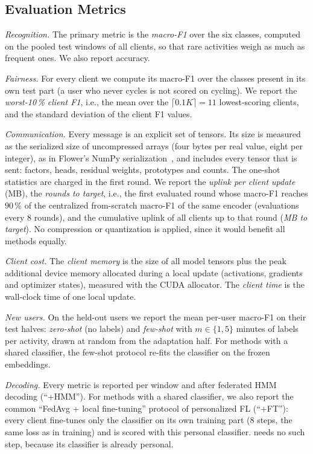 \subsection{Evaluation Metrics}\label{sec:data:metrics}

\emph{Recognition.} The primary metric is the \emph{macro-F1} over the six classes, computed on the
pooled test windows of all clients, so that rare activities weigh as much as frequent ones. We
also report accuracy.

\emph{Fairness.} For every client we compute its macro-F1 over the classes present in its own test
part (a user who never cycles is not scored on cycling). We report the \emph{worst-10\,\% client F1},
i.e., the mean over the $\lceil0.1K\rceil=11$ lowest-scoring clients, and the standard deviation of
the client F1 values.

\emph{Communication.} Every message is an explicit set of tensors. Its size is measured as the
serialized size of uncompressed arrays (four bytes per real value, eight per integer), as in
Flower's NumPy serialization~\cite{beutel2020flower}, and includes every tensor that is sent: factors,
heads, residual weights, prototypes and counts. The one-shot statistics are charged in the first
round. We report the \emph{uplink per client update} (MB), the \emph{rounds to target}, i.e., the first
evaluated round whose macro-F1 reaches $90\,\%$ of the centralized from-scratch macro-F1 of the same
encoder (evaluations every $8$ rounds), and the cumulative uplink of all clients up to that round
(\emph{MB to target}). No compression or quantization is applied, since it would benefit all methods
equally.

\emph{Client cost.} The \emph{client memory} is the size of all model tensors plus the peak additional
device memory allocated during a local update (activations, gradients and optimizer states), measured
with the CUDA allocator. The \emph{client time} is the wall-clock time of one local update.

\emph{New users.} On the \NumHeldout{} held-out users we report the mean per-user macro-F1 on their test
halves: \emph{zero-shot} (no labels) and \emph{few-shot} with $m\in\{1,5\}$ minutes of labels per
activity, drawn at random from the adaptation half. For methods with a shared classifier, the
few-shot protocol re-fits the classifier on the frozen embeddings.

\emph{Decoding.} Every metric is reported per window and after federated HMM decoding (``+HMM'').
For methods with a shared classifier, we also report the common ``FedAvg + local fine-tuning''
protocol of personalized FL (``+FT''): every client fine-tunes only the classifier on its own
training part ($8$ steps, the same loss as in training) and is scored with this personal classifier.
\method{} needs no such step, because its classifier is already personal.

